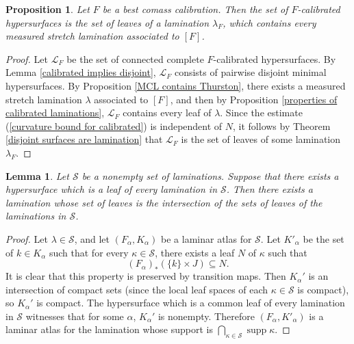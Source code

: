 \documentclass[reqno,11pt]{amsart}
\DeclareMathOperator{\supp}{supp}
\newtheorem{lemma}[theorem]{Lemma}
\newtheorem{proposition}[theorem]{Proposition}
\theoremstyle{definition}
\numberwithin{equation}{section}
\begin{document}
\begin{proposition}\label{existence of semicanonical lamination}
Let $F$ be a best comass calibration.
Then the set of $F$-calibrated hypersurfaces is the set of leaves of a lamination $\lambda_F$, which contains every measured stretch lamination associated to $[F]$.
\end{proposition}
\begin{proof}
Let $\mathscr L_F$ be the set of connected complete $F$-calibrated hypersurfaces.
By Lemma \ref{calibrated implies disjoint}, $\mathscr L_F$ consists of pairwise disjoint minimal hypersurfaces.
By Proposition \ref{MCL contains Thurston}, there exists a measured stretch lamination $\lambda$ associated to $[F]$, and then by Proposition \ref{properties of calibrated laminations}, $\mathscr L_F$ contains every leaf of $\lambda$.
Since the estimate (\ref{curvature bound for calibrated}) is independent of $N$, it follows by Theorem \ref{disjoint surfaces are lamination} that $\mathscr L_F$ is the set of leaves of some lamination $\lambda_F$.
\end{proof}

\begin{lemma}\label{existence of intersections}
Let $\mathscr S$ be a nonempty set of laminations.
Suppose that there exists a hypersurface which is a leaf of every lamination in $\mathscr S$.
Then there exists a lamination whose set of leaves is the intersection of the sets of leaves of the laminations in $\mathscr S$.
\end{lemma}
\begin{proof}
Let $\lambda \in \mathscr S$, and let $(F_\alpha, K_\alpha)$ be a laminar atlas for $\mathscr S$.
Let $K'_\alpha$ be the set of $k \in K_\alpha$ such that for every $\kappa \in \mathscr S$, there exists a leaf $N$ of $\kappa$ such that
$$(F_\alpha)_*(\{k\} \times J) \subseteq N.$$
It is clear that this property is preserved by transition maps.
Then $K_\alpha'$ is an intersection of compact sets (since the local leaf spaces of each $\kappa \in \mathscr S$ is compact), so $K_\alpha'$ is compact.
The hypersurface which is a common leaf of every lamination in $\mathscr S$ witnesses that for some $\alpha$, $K_\alpha'$ is nonempty.
Therefore $(F_\alpha, K'_\alpha)$ is a laminar atlas for the lamination whose support is $\bigcap_{\kappa \in \mathscr S} \supp \kappa$.
\end{proof}
\end{document}
